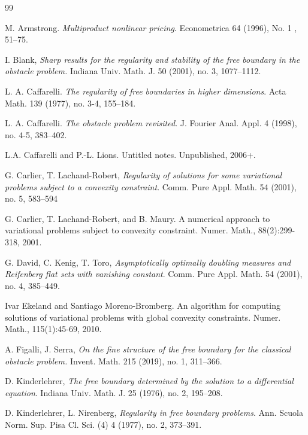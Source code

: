 \documentclass[reqno,11pt]{amsart}
\numberwithin{equation}{section}
\theoremstyle{remark}
\begin{document}
\begin{thebibliography}{99}




M. Armstrong. \emph{Multiproduct nonlinear pricing}. Econometrica 64 (1996), No. 1 , 51--75.


I. Blank, 
\emph{Sharp results for the regularity and stability of the free boundary in the obstacle problem.}
Indiana Univ. Math. J. 50 (2001), no. 3, 1077--1112.



 

L. A. Caffarelli. \emph{The regularity of free boundaries in higher dimensions}. Acta Math. 139 (1977), no. 3-4, 155--184.

L. A. Caffarelli. \emph{The obstacle problem revisited}. J. Fourier Anal. Appl. 4 (1998), no. 4-5, 383--402.

L.A. Caffarelli and P.-L. Lions. Untitled notes. Unpublished, 2006+.

G. Carlier, T. Lachand-Robert, \emph{Regularity of solutions for some variational problems subject to a convexity constraint}.  Comm. Pure Appl. Math. 54 (2001), no. 5, 583--594


G. Carlier, T. Lachand-Robert, and B. Maury. A numerical approach to variational
problems subject to convexity constraint. Numer. Math., 88(2):299-318, 2001.

G. David, C.  Kenig, T. Toro, 
\emph{Asymptotically optimally doubling measures and Reifenberg flat sets with vanishing constant}.
Comm. Pure Appl. Math. 54 (2001), no. 4, 385--449.

Ivar Ekeland and Santiago Moreno-Bromberg. An algorithm for computing solutions
of variational problems with global convexity constraints. Numer. Math., 115(1):45-69,
2010.

A. Figalli, J. Serra, 
\emph{On the fine structure of the free boundary for the classical obstacle problem.}
Invent. Math. 215 (2019), no. 1, 311--366.

D. Kinderlehrer, \emph{The free boundary determined by the solution to a differential equation}.
Indiana Univ. Math. J. 25 (1976), no. 2, 195--208.

D. Kinderlehrer,   L.  Nirenberg, \emph{Regularity in free boundary problems}. Ann. Scuola Norm. Sup. Pisa Cl. Sci. (4) 4 (1977), no. 2, 373--391.



\end{thebibliography}
\end{document}
